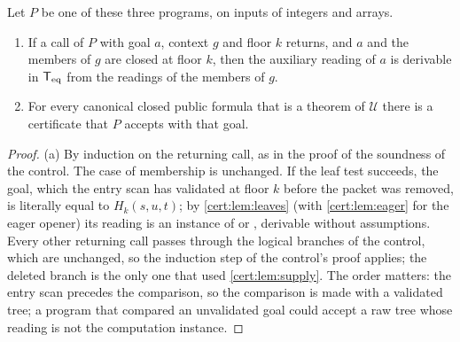 \begin{proposition}\label{cert:prop:leaf}
Let $P$ be one of these three programs, on inputs of integers and arrays.
\begin{enumerate}[label=(\alph*)]
\item If a call of $P$ with goal $a$, context $g$ and floor $k$ returns, and
$a$ and the members of $g$ are closed at floor $k$, then the auxiliary reading
of $a$ is derivable in $\mathsf{T}_{\mathrm{eq}}$ from the readings of the members of $g$.
\item For every canonical closed public formula that is a theorem of
$\mathcal U$ there is a certificate that $P$ accepts with that goal.
\end{enumerate}
\end{proposition}
\begin{proof}
(a) By induction on the returning call, as in the proof of the soundness of
the control. The case of membership is unchanged. If the leaf test succeeds,
the goal, which the entry scan has validated at floor $k$ before the packet
was removed, is literally equal to $H_k(s,u,t)$; by \cref{cert:lem:leaves}
(with \cref{cert:lem:eager} for the eager opener) its reading is an instance
of  or , derivable without assumptions. Every other
returning call passes through the logical branches of the control, which are
unchanged, so the induction step of the control's proof applies; the deleted
branch is the only one that used \cref{cert:lem:supply}. The order matters:
the entry scan precedes the comparison, so the comparison is made with a
validated tree; a program that compared an unvalidated goal could accept a
raw tree whose reading is not the computation instance.


\end{proof}
